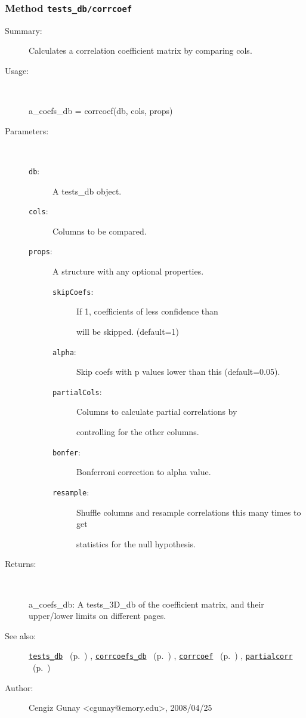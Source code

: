 \subsubsection[Method \texttt{corrcoef}]{Method \texttt{tests\_db/corrcoef}}%
%
\label{ref_tests_db__corrcoef}%
\hypertarget{ref_tests_db__corrcoef}{}%
\begin{description}
\item[Summary:]Calculates a correlation coefficient matrix by comparing cols.
%
\item[Usage:]~%
\begin{lyxcode}%
a\_coefs\_db = corrcoef(db, cols, props)
%
\end{lyxcode}%
%
%
\item[Parameters:]~
\begin{description}%
\item[\texttt{db}:]
 A tests\_db object.
\item[\texttt{cols}:]
 Columns to be compared.
\item[\texttt{props}:]
 A structure with any optional properties.
\begin{description}%
\item[\texttt{skipCoefs}:]
 If 1, coefficients of less confidence than %

will be skipped. (default=1)
\item[\texttt{alpha}:]
 Skip coefs with p values lower than this (default=0.05).
\item[\texttt{partialCols}:]
 Columns to calculate partial correlations by

controlling for the other columns.
\item[\texttt{bonfer}:]
 Bonferroni correction to alpha value.
\item[\texttt{resample}:]
 Shuffle columns and resample correlations this many times to get

statistics for the null hypothesis.
\end{description}%
\end{description}%
%
\item[Returns:
]~

	a\_coefs\_db: A tests\_3D\_db of the coefficient matrix, and their
		upper/lower limits on different pages.
%
%
\item[See also:]%
\hyperlink{ref_tests_db}{\texttt{tests\_db}}%
\ (p.~\pageref{ref_tests_db})%
%
, \hyperlink{ref_corrcoefs_db}{\texttt{corrcoefs\_db}}%
\ (p.~\pageref{ref_corrcoefs_db})%
%
, \hyperlink{ref_corrcoef}{\texttt{corrcoef}}%
\ (p.~\pageref{ref_corrcoef})%
%
, \hyperlink{ref_partialcorr}{\texttt{partialcorr}}%
\ (p.~\pageref{ref_partialcorr})%
%
%
\item[Author:]%
Cengiz Gunay <cgunay@emory.edu>, 2008/04/25
%
\end{description}
\methodline%
